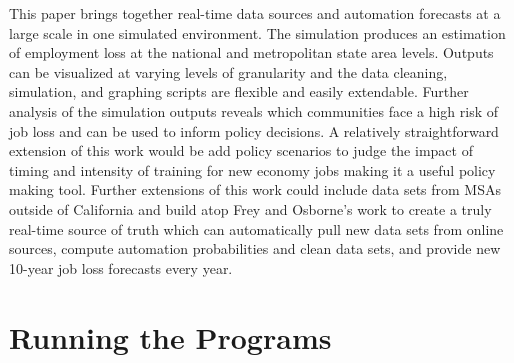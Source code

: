\documentclass[10pt]{article}
\begin{document}
This paper brings together real-time data sources and automation forecasts at a large scale in one simulated environment. The simulation produces an estimation of employment loss at the national and metropolitan state area levels. Outputs can be visualized at varying levels of granularity and the data cleaning, simulation, and graphing scripts are flexible and easily extendable. Further analysis of the simulation outputs reveals which communities face a high risk of job loss and can be used to inform policy decisions. A relatively straightforward extension of this work would be add policy scenarios to judge the impact of timing and intensity of training for new economy jobs making it a useful policy making tool. Further extensions of this work could include data sets from MSAs outside of California and build atop Frey and Osborne's work to create a truly real-time source of truth which can automatically pull new data sets from online sources, compute automation probabilities and clean data sets, and provide new 10-year job loss forecasts every year.




\appendix

\section{Running the Programs}
\end{document}
